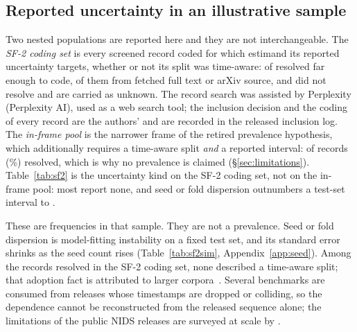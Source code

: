 \documentclass[a4paper,fleqn]{cas-dc}
\newcommand{\tabwidth}{\columnwidth}
\newcommand{\tabbody}{\small\setlength{\tabcolsep}{3.5pt}\renewcommand{\arraystretch}{1.08}}
\newcommand{\onetab}{\renewcommand{\tabwidth}{\columnwidth}\tabbody}
\begin{document}
\subsection{Reported uncertainty in an illustrative sample}\label{sec:results-sf2}
Two nested populations are reported here and they are not interchangeable.
The \emph{SF-2 coding set} is every screened record coded for which estimand its reported uncertainty targets, whether or not its split was time-aware: \NsfTwoRes{} of \NsfTwo{} resolved far enough to code, \NsfTwoStrict{} of them from fetched full text or arXiv source, and \NsfTwoUnres{} did not resolve and are carried as unknown. The record search was assisted by Perplexity (Perplexity AI), used as a web search tool; the inclusion decision and the coding of every record are the authors' and are recorded in the released inclusion log.
The \emph{in-frame pool} is the narrower frame of the retired prevalence hypothesis, which additionally requires a time-aware split \emph{and} a reported interval: \NinframeRes{} of \Ninframe{} records (\ResRate\%) resolved, which is why no prevalence is claimed (\S\ref{sec:limitations}).
Table~\ref{tab:sf2} is the uncertainty kind on the SF-2 coding set, not on the in-frame pool: most report none, and seed or fold dispersion outnumbers a test-set interval \NsfTwoSeedFold{} to \NsfTwoTestCI{}.
\begin{table}[H]
\centering
\caption{Uncertainty kind in the SF-2 coding set ($\NsfTwoRes$ of $\NsfTwo$ screened records
resolved far enough to code). This is the wider of the two populations of
\S\ref{sec:results-sf2}: it does not require a time-aware split, so it is not the \Ninframe-record
in-frame pool. Unresolved records are reported as unknown, never as none.
From \texttt{corpus/sf2\_uncertainty\_kind.csv}.}\label{tab:sf2}
\onetab

\end{table}
These are frequencies in that sample. They are not a prevalence.
Seed or fold dispersion is model-fitting instability on a fixed test set, and its standard error shrinks as the seed count rises (Table~\ref{tab:sf2sim}, Appendix~\ref{app:seed}).
Among the records resolved in the SF-2 coding set, none described a time-aware split; that adoption fact is attributed to larger corpora~\citep{arp2022dos,pendlebury2019tesseract,lew2026deployment}.
Several benchmarks are consumed from releases whose timestamps are dropped or colliding, so the dependence cannot be reconstructed from the released sequence alone; the limitations of the public NIDS releases are surveyed at scale by \citet{goldschmidt2025datasets}.
\end{document}
